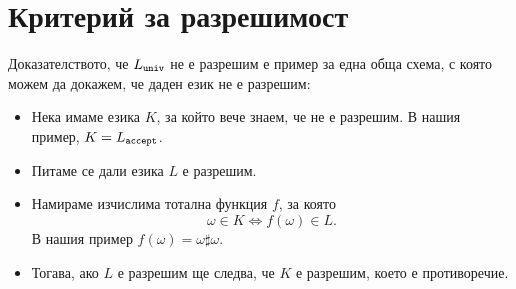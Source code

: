 \section{Критерий за разрешимост}


\begin{important}
  Доказателството, че $L_{\texttt{univ}}$ не е разрешим е пример за една обща схема, с която можем да докажем, че даден език не е разрешим:
  \begin{itemize}
  \item 
    Нека имаме езика $K$, за който вече знаем, че не е разрешим.
    В нашия пример, $K = L_{\texttt{accept}}$.
  \item
    Питаме се дали езика $L$ е разрешим.
  \item
    Намираме изчислима тотална функция $f$, за която
    \[\omega \in K \iff f(\omega) \in L.\]
    В нашия пример $f(\omega) = \omega \sharp \omega$.
  \item
    Тогава, ако $L$ е разрешим ще следва, че $K$ е разрешим, което е противоречие.
  \end{itemize}
\end{important}

